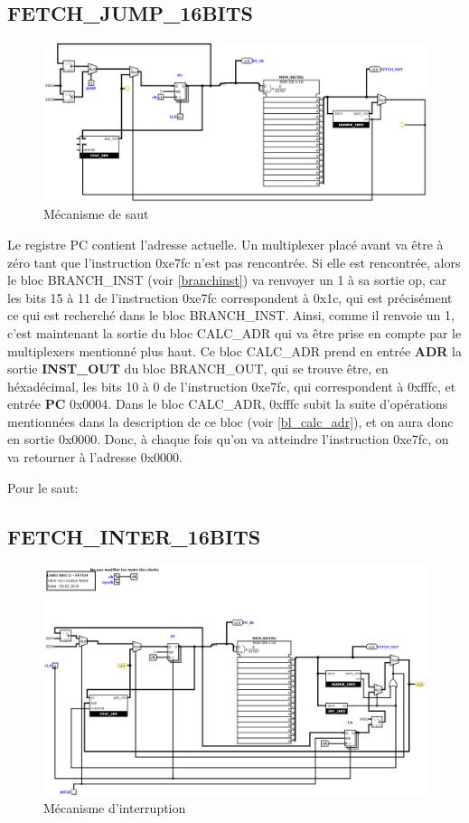 \documentclass[a4paper]{article} %
\begin{document}
\subsection{FETCH\_JUMP\_16BITS}
\begin{figure}[H]
    \centering
    \includegraphics[width=1\textwidth]{src/FETCH_JUMP.png}
    \caption{Mécanisme de saut}
    \label{fetch_jump}
\end{figure}
Le registre PC contient l'adresse actuelle. Un multiplexer placé avant va être à zéro tant que l'instruction 0xe7fc n'est pas rencontrée. Si elle est rencontrée, alors le bloc BRANCH\_INST (voir \ref{branchinst}) va renvoyer un 1 à sa sortie op, car les bits 15 à 11 de l'instruction 0xe7fc correspondent à 0x1c, qui est précisément ce qui est recherché dans le bloc BRANCH\_INST. Ainsi, comme il renvoie un 1, c'est maintenant la sortie du bloc CALC\_ADR qui va être prise en compte par le multiplexers mentionné plus haut. Ce bloc CALC\_ADR prend en entrée \textbf{ADR} la sortie \textbf{INST\_OUT} du bloc BRANCH\_OUT, qui se trouve être, en héxadécimal, les bits 10 à 0 de l'instruction 0xe7fc, qui correspondent à 0xfffc, et entrée \textbf{PC} 0x0004. Dans le bloc CALC\_ADR, 0xfffc subit la suite d'opérations mentionnées dans la description de ce bloc (voir \ref{bl_calc_adr}), et on aura donc en sortie 0x0000. Donc, à chaque fois qu'on va atteindre l'instruction 0xe7fc, on va retourner à l'adresse 0x0000.

Pour le saut:
\subsection{FETCH\_INTER\_16BITS}
\begin{figure}[H]
    \centering
    \includegraphics[width=1\textwidth]{src/FETCH_INTER.png}
    \caption{Mécanisme d'interruption}
    \label{fetch_inter}
\end{figure}
\end{document}
